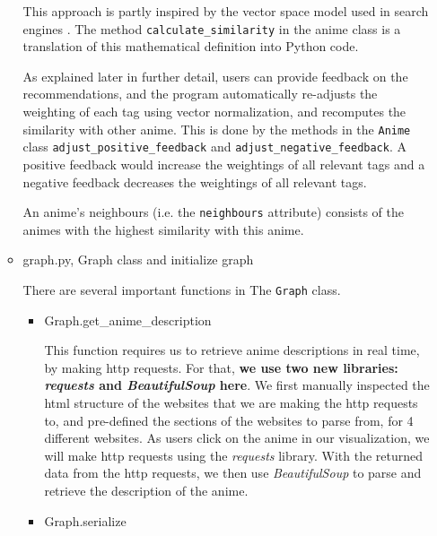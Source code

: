 \documentclass[12pt]{article}
\begin{document}
\begin{enumerate}
\begin{text}
\begin{itemize}
    This approach is partly inspired by the vector space model used in search engines \citep{vspace}. The method \texttt{calculate\_similarity} in the anime class is a translation of this mathematical definition into Python code.
    
    As explained later in further detail, users can provide feedback on the recommendations, and the program automatically re-adjusts the weighting of each tag using vector normalization, and recomputes the similarity with other anime. This is done by the methods in the \texttt{Anime} class \texttt{adjust\_positive\_feedback} and \texttt{adjust\_negative\_feedback}. A positive feedback would increase the weightings of all relevant tags and a negative feedback decreases the weightings of all relevant tags.
    
    An anime's neighbours (i.e. the \texttt{neighbours} attribute) consists of the animes with the highest similarity with this anime.
    
    \item graph.py, Graph class and initialize graph

    There are several important functions in The \texttt{Graph} class.
    
    \begin{itemize}
        \item Graph.get\_anime\_description
        
            This function requires us to retrieve anime descriptions in real time, by making http requests. For that, \textbf{we use two new libraries: \textit{requests} and \textit{BeautifulSoup} here}. We first manually inspected the html structure of the websites that we are making the http requests to, and pre-defined the sections of the websites to parse from, for 4 different websites. As users click on the anime in our visualization, we will make http requests using the \textit{requests} library. With the returned data from the http requests, we then use \textit{BeautifulSoup} to parse and retrieve the description of the anime.
            
        \item Graph.serialize
        

\end{itemize}
\end{itemize}
\end{text}
\end{enumerate}
\end{document}
